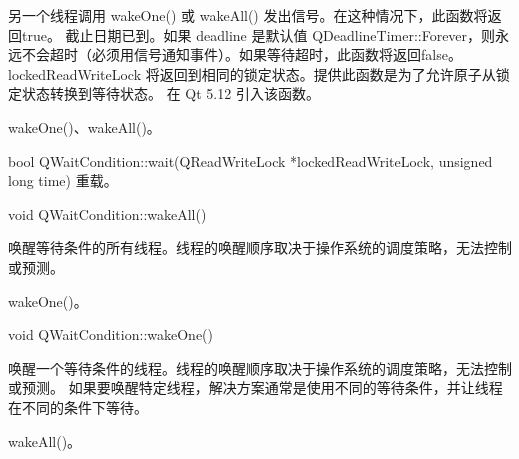 另一个线程调用 wakeOne() 或 wakeAll() 发出信号。在这种情况下，此函数将返回true。
截止日期已到。如果 deadline 是默认值 QDeadlineTimer::Forever，则永远不会超时（必须用信号通知事件）。如果等待超时，此函数将返回false。
lockedReadWriteLock 将返回到相同的锁定状态。提供此函数是为了允许原子从锁定状态转换到等待状态。
在 Qt 5.12 引入该函数。


\begin{notice}[另请参阅]
wakeOne()、wakeAll()。
\end{notice}


bool QWaitCondition::wait(QReadWriteLock *lockedReadWriteLock, unsigned long time)
重载。

void QWaitCondition::wakeAll()

唤醒等待条件的所有线程。线程的唤醒顺序取决于操作系统的调度策略，无法控制或预测。




\begin{notice}[另请参阅]
wakeOne()。
\end{notice}

void QWaitCondition::wakeOne()

唤醒一个等待条件的线程。线程的唤醒顺序取决于操作系统的调度策略，无法控制或预测。
如果要唤醒特定线程，解决方案通常是使用不同的等待条件，并让线程在不同的条件下等待。

\begin{notice}[另请参阅]
wakeAll()。
\end{notice}
